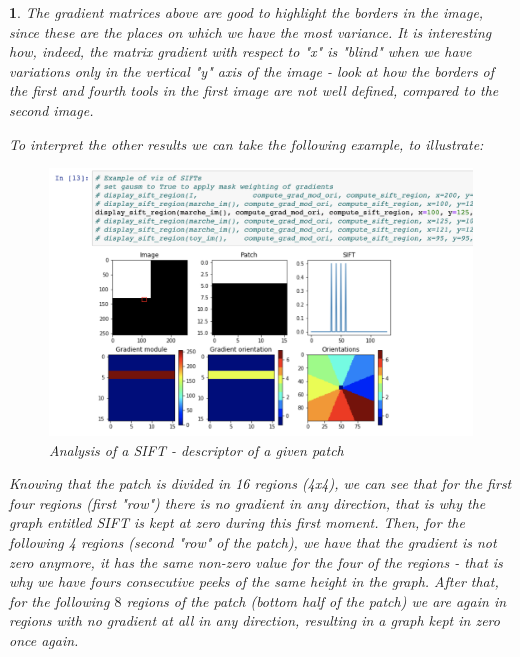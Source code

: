 \documentclass[10pt]{article} %
\theoremstyle{question-style}
\newtheorem{answer}{\arabic{answer}}
\begin{document}
\begin{flushleft}
\begin{answer}
\quad The gradient matrices above are good to highlight the borders in the image, since these are the places on which we have the most variance. It is interesting how, indeed, the matrix gradient with respect to "x" is "blind" when we have variations only in the vertical "y" axis of the image - look at how the borders of the first and fourth tools in the first image are not well defined, compared to the second image. 

\quad To interpret the other results we can take the following example, to illustrate:  

\begin{figure}[H]
	\begin{center}
		\includegraphics[scale=0.5]{regions.png} %
	\end{center}
	\caption{Analysis of a SIFT - descriptor of a given patch}
	\label{fig:regions}
\end{figure}

\quad Knowing that the patch is divided in 16 regions (4x4), we can see that for the first four regions (first "row") there is no gradient in any direction, that is why the graph entitled SIFT is kept at zero during this first moment. Then, for the following 4 regions (second "row" of the patch), we have that the gradient is not zero anymore, it has the same non-zero value for the four of the regions - that is why we have fours consecutive peeks of the same height in the graph. After that, for the following $8$ regions of the patch (bottom half of the patch) we are again in regions with no gradient at all in any direction, resulting in a graph kept in zero once again.

\end{answer}


\end{flushleft}
\end{document}
